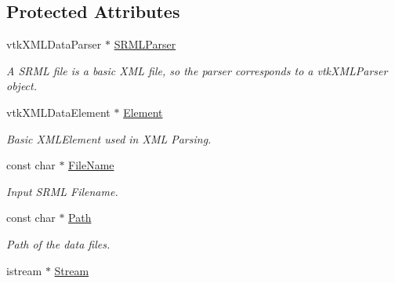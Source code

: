 \subsection*{Protected Attributes}
\begin{DoxyCompactItemize}
\item 
\hypertarget{classvtkSRMLImporter_a65cc2991118b46c1404323568c3677e9}{
vtkXMLDataParser $\ast$ \hyperlink{classvtkSRMLImporter_a65cc2991118b46c1404323568c3677e9}{SRMLParser}}
\label{classvtkSRMLImporter_a65cc2991118b46c1404323568c3677e9}

\begin{DoxyCompactList}\small\item\em A SRML file is a basic XML file, so the parser corresponds to a vtkXMLParser object. \item\end{DoxyCompactList}\item 
\hypertarget{classvtkSRMLImporter_ab2947908aa3b3c13cf939a7f7234ec47}{
vtkXMLDataElement $\ast$ \hyperlink{classvtkSRMLImporter_ab2947908aa3b3c13cf939a7f7234ec47}{Element}}
\label{classvtkSRMLImporter_ab2947908aa3b3c13cf939a7f7234ec47}

\begin{DoxyCompactList}\small\item\em Basic XMLElement used in XML Parsing. \item\end{DoxyCompactList}\item 
\hypertarget{classvtkSRMLImporter_a40b0867e1ae9d16073214298d93bce57}{
const char $\ast$ \hyperlink{classvtkSRMLImporter_a40b0867e1ae9d16073214298d93bce57}{FileName}}
\label{classvtkSRMLImporter_a40b0867e1ae9d16073214298d93bce57}

\begin{DoxyCompactList}\small\item\em Input SRML Filename. \item\end{DoxyCompactList}\item 
\hypertarget{classvtkSRMLImporter_a25c57ab8924a893573228217c2e98886}{
const char $\ast$ \hyperlink{classvtkSRMLImporter_a25c57ab8924a893573228217c2e98886}{Path}}
\label{classvtkSRMLImporter_a25c57ab8924a893573228217c2e98886}

\begin{DoxyCompactList}\small\item\em Path of the data files. \item\end{DoxyCompactList}\item 
\hypertarget{classvtkSRMLImporter_a02805ba7383ee6f553ca38c8bf3d9a9c}{
istream $\ast$ \hyperlink{classvtkSRMLImporter_a02805ba7383ee6f553ca38c8bf3d9a9c}{Stream}}
\label{classvtkSRMLImporter_a02805ba7383ee6f553ca38c8bf3d9a9c}


\end{DoxyCompactItemize}
